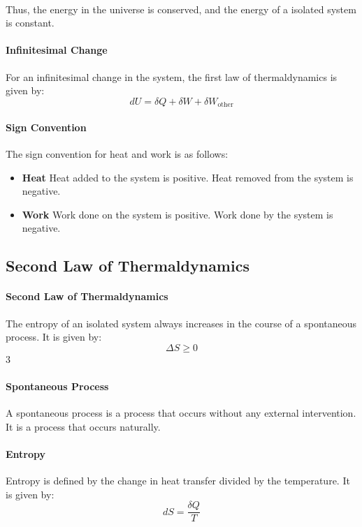 \documentclass[11pt]{article}
\begin{document}
\paragraph{} Thus, the energy in the universe is conserved, and the energy of a isolated system is constant. 
\paragraph{Infinitesimal Change} For an infinitesimal change in the system, the first law of thermaldynamics is given by:
\begin{equation}
    dU = \delta Q + \delta W + \delta W_{\text{other}} 
\end{equation}
\paragraph{Sign Convention} The sign convention for heat and work is as follows:
\begin{itemize}
    \item \textbf{Heat} Heat added to the system is positive. Heat removed from the system is negative.
    \item \textbf{Work} Work done on the system is positive. Work done by the system is negative.
\end{itemize}
\subsection{Second Law of Thermaldynamics}
\paragraph{Second Law of Thermaldynamics} The entropy of an isolated system always increases in the course of a spontaneous process. It is given by:
\begin{equation}
    \Delta S \ge 0
\end{equation}3
\paragraph{Spontaneous Process} A spontaneous process is a process that occurs without any external intervention. It is a process that occurs naturally.
\paragraph{Entropy} Entropy is defined by the change in heat transfer divided by the temperature. It is given by:
\begin{equation}
    dS = \frac{\delta Q}{T}
\end{equation}
\end{document}
